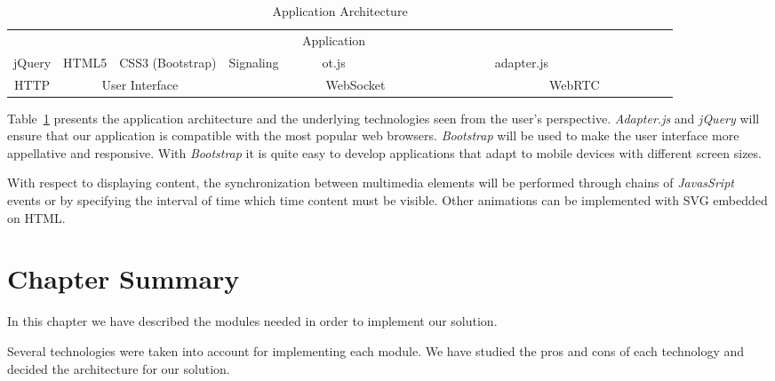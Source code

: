 \begin{table}[H]
\centering
	\caption{Application Architecture}
	\label{table:apparch}
    \begin{tabular}{cccccccc@{}m{0pt}@{}}
	\hline 
\multicolumn{8}{|c|}{\cellcolor{Gray}Application}  &\\[12pt]\cline{1-5}\cline{7-7}
\multicolumn{1}{|c|}{jQuery} & \multicolumn{1}{c|}{HTML5} & \multicolumn{1}{c|}{CSS3 (Bootstrap)} & \multicolumn{1}{c|}{Signaling} & \multicolumn{1}{c|}{~~~~~ot.js~~~~~} & \multicolumn{1}{c|}{\cellcolor{Gray}~~~~~~~~~~~~~~~} & \multicolumn{1}{c|}{adapter.js} &   \multicolumn{1}{c|}{\cellcolor{Gray}~~~~~~~~~~~~~~~} &\\[12pt]\hline
\multicolumn{1}{|c|}{HTTP} & \multicolumn{2}{c|}{User Interface}  & \multicolumn{3}{c|}{WebSocket}    & \multicolumn{2}{c|}{WebRTC}      &\\[12pt]\hline
\end{tabular}
\end{table}


Table~\ref{table:apparch} presents the application architecture and the underlying technologies seen from the user's perspective. \emph{Adapter.js} and \emph{jQuery} will ensure that our application is compatible with the most popular web browsers.
\emph{Bootstrap} will be used to make the user interface more appellative and responsive. With \emph{Bootstrap} it is quite easy to develop applications that adapt to mobile devices with different screen sizes.

With respect to displaying content, the synchronization between multimedia elements will be performed through chains of \emph{JavasSript} events or by specifying the interval of time which time content must be visible. Other animations can be implemented with \ac{SVG} embedded on \ac{HTML}.

\section{Chapter Summary}
\label{architecture:summary}

In this chapter we have described the modules needed in order to implement our solution.

Several technologies were taken into account for implementing each module. We have studied the pros and cons of each technology and decided the architecture for our solution.


